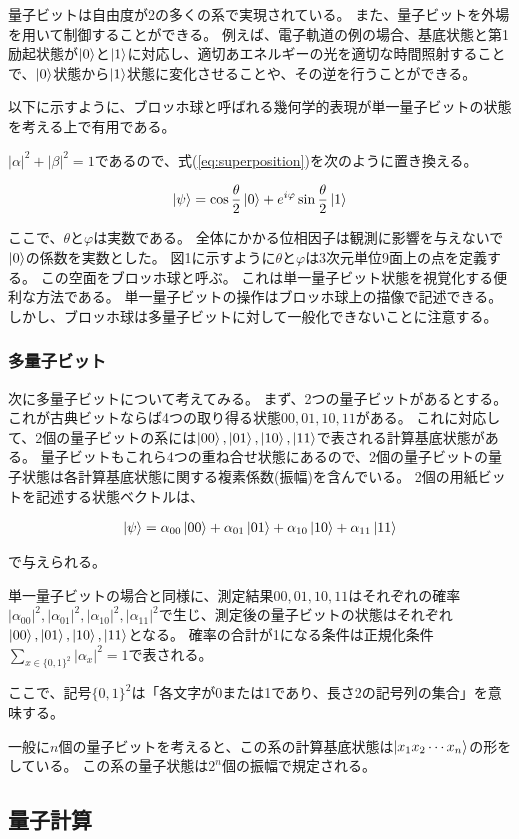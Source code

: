 \documentclass[platex,dvipdfmx]{jlreq}			%
\begin{document}
量子ビットは自由度が2の多くの系で実現されている。
また、量子ビットを外場を用いて制御することができる。
例えば、電子軌道の例の場合、基底状態と第1励起状態が$\ket{0}$と$\ket{1}$に対応し、適切あエネルギーの光を適切な時間照射することで、$\ket{0}$状態から$\ket{1}$状態に変化させることや、その逆を行うことができる。

以下に示すように、ブロッホ球と呼ばれる幾何学的表現が単一量子ビットの状態を考える上で有用である。

$|\alpha|^2 + |\beta|^2 = 1$であるので、式(\ref{eq:superposition})を次のように置き換える。

\begin{eqnarray}
    \ket{\psi} = \cos \frac{\theta}{2} \ket{0} + e^{i \varphi}\sin \frac{\theta}{2} \ket{1}
\end{eqnarray}

ここで、$\theta$と$\varphi$は実数である。
全体にかかる位相因子は観測に影響を与えないで$\ket{0}$の係数を実数とした。
図1に示すように$\theta$と$\varphi$は3次元単位9面上の点を定義する。
この空面をブロッホ球と呼ぶ。
これは単一量子ビット状態を視覚化する便利な方法である。
単一量子ビットの操作はブロッホ球上の描像で記述できる。
しかし、ブロッホ球は多量子ビットに対して一般化できないことに注意する。

\subsubsection{多量子ビット}
次に多量子ビットについて考えてみる。
まず、2つの量子ビットがあるとする。
これが古典ビットならば4つの取り得る状態$00, 01, 10, 11$がある。
これに対応して、2個の量子ビットの系には$\ket{00}, \ket{01}, \ket{10}, \ket{11}$で表される計算基底状態がある。
量子ビットもこれら4つの重ね合せ状態にあるので、2個の量子ビットの量子状態は各計算基底状態に関する複素係数(振幅)を含んでいる。
2個の用紙ビットを記述する状態ベクトルは、

\begin{eqnarray}
    \ket{\psi} = \alpha_{00} \ket{00} + \alpha_{01} \ket{01} + \alpha_{10} \ket{10} + \alpha_{11} \ket{11}
\end{eqnarray}

で与えられる。


単一量子ビットの場合と同様に、測定結果$00, 01, 10, 11$はそれぞれの確率$|\alpha_{00}|^2, |\alpha_{01}|^2, |\alpha_{10}|^2, |\alpha_{11}|^2$で生じ、測定後の量子ビットの状態はそれぞれ$\ket{00}, \ket{01}, \ket{10}, \ket{11}$となる。
確率の合計が1になる条件は正規化条件$\sum_{x \in \{0, 1\}^2} |\alpha_x|^2 = 1$で表される。

ここで、記号$\{ 0, 1 \}^2$は「各文字が0または1であり、長さ2の記号列の集合」を意味する。

一般に$n$個の量子ビットを考えると、この系の計算基底状態は$\ket{x_1 x_2 \cdots x_n}$の形をしている。
この系の量子状態は$2^n$個の振幅で規定される。


\subsection{量子計算}
    
\end{document}
